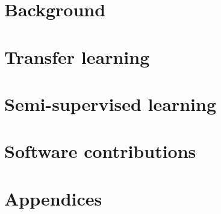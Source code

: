 % 
\pagestyle{empty}



\frontmatter






\mainmatter
\pagestyle{scrheadings}



\part{Background}
\label{part:background}



\part{Transfer learning}
\label{part:transfer}



\part{Semi-supervised learning}
\label{part:segmentation}


\part{Software contributions}
\label{part:software}


\appendix
\part{Appendices}




\backmatter
\listoffigures
\listoftables

\printbibliography





